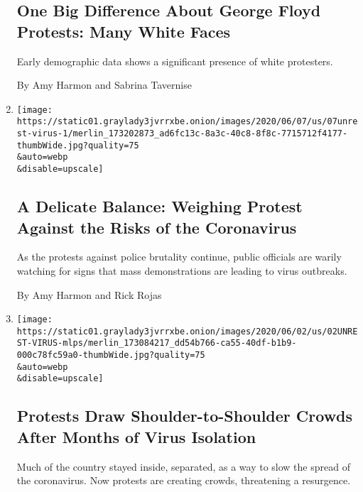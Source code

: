 \begin{enumerate}
  \hypertarget{one-big-difference-about-george-floyd-protests-many-white-faces}{%
  \subsection{One Big Difference About George Floyd Protests: Many White
  Faces}\label{one-big-difference-about-george-floyd-protests-many-white-faces}}

  Early demographic data shows a significant presence of white
  protesters.

  By Amy Harmon and Sabrina Tavernise
\item
  \href{/2020/06/07/us/Protest-coronavirus-george-floyd.html}{}

  \texttt{[image: https://static01.graylady3jvrrxbe.onion/images/2020/06/07/us/07unrest-virus-1/merlin\_173202873\_ad6fc13c-8a3c-40c8-8f8c-7715712f4177-thumbWide.jpg?quality=75\\\&auto=webp\\\&disable=upscale]}

  \hypertarget{a-delicate-balance-weighing-protest-against-the-risks-of-the-coronavirus}{%
  \subsection{A Delicate Balance: Weighing Protest Against the Risks of
  the
  Coronavirus}\label{a-delicate-balance-weighing-protest-against-the-risks-of-the-coronavirus}}

  As the protests against police brutality continue, public officials
  are warily watching for signs that mass demonstrations are leading to
  virus outbreaks.

  By Amy Harmon and Rick Rojas
\item
  \href{/2020/06/02/us/coronavirus-protests-george-floyd.html}{}

  \texttt{[image: https://static01.graylady3jvrrxbe.onion/images/2020/06/02/us/02UNREST-VIRUS-mlps/merlin\_173084217\_dd54b766-ca55-40df-b1b9-000c78fc59a0-thumbWide.jpg?quality=75\\\&auto=webp\\\&disable=upscale]}

  \hypertarget{protests-draw-shoulder-to-shoulder-crowds-after-months-of-virus-isolation}{%
  \subsection{Protests Draw Shoulder-to-Shoulder Crowds After Months of
  Virus
  Isolation}\label{protests-draw-shoulder-to-shoulder-crowds-after-months-of-virus-isolation}}

  Much of the country stayed inside, separated, as a way to slow the
  spread of the coronavirus. Now protests are creating crowds,
  threatening a resurgence.


\end{enumerate}
